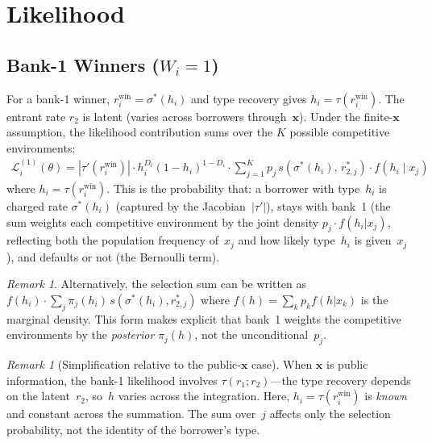 \documentclass[12pt]{article}
\theoremstyle{plain}
\theoremstyle{plain}
\theoremstyle{definition}
\theoremstyle{remark}
\newtheorem{remark}[thm]{Remark}
\begin{document}
\newpage
\section{Likelihood}\label{sec:likelihood8}

\subsection{Bank-1 Winners ($W_i = 1$)}

For a bank-1 winner, $r_i^{\text{win}} = \sigma^*(h_i)$ and type recovery gives $h_i = \tau(r_i^{\text{win}})$.  The entrant rate $r_2$ is latent (varies across borrowers through~$\mathbf{x}$).  Under the finite-$\mathbf{x}$ assumption, the likelihood contribution sums over the $K$ possible competitive environments:
\begin{align}\label{eq:L1_8}
    \boxed{\mathcal{L}_i^{(1)}(\theta) = |\tau'(r_i^{\text{win}})| \cdot h_i^{D_i}(1-h_i)^{1-D_i} \cdot \sum_{j=1}^K p_j\, s(\sigma^*(h_i),\, r_{2,j}^*) \cdot f(h_i \mid x_j)}
\end{align}
where $h_i = \tau(r_i^{\text{win}})$.  This is the probability that: a borrower with type~$h_i$ is charged rate $\sigma^*(h_i)$ (captured by the Jacobian~$|\tau'|$), stays with bank~1 (the sum weights each competitive environment by the joint density $p_j \cdot f(h_i|x_j)$, reflecting both the population frequency of~$x_j$ and how likely type~$h_i$ is given~$x_j$), and defaults or not (the Bernoulli term).

\begin{remark}
Alternatively, the selection sum can be written as $f(h_i) \cdot \sum_j \pi_j(h_i)\, s(\sigma^*(h_i), r_{2,j}^*)$ where $f(h) = \sum_k p_k f(h|x_k)$ is the marginal density.  This form makes explicit that bank~1 weights the competitive environments by the \emph{posterior} $\pi_j(h)$, not the unconditional~$p_j$.
\end{remark}

\begin{remark}[Simplification relative to the public-$\mathbf{x}$ case]\label{rem:L1_simple}
When $\mathbf{x}$ is public information, the bank-1 likelihood involves $\tau(r_1; r_2)$---the type recovery depends on the latent~$r_2$, so~$h$ varies across the integration.  Here, $h_i = \tau(r_i^{\text{win}})$ is \emph{known} and constant across the summation.  The sum over~$j$ affects only the selection probability, not the identity of the borrower's type.
\end{remark}
\end{document}
